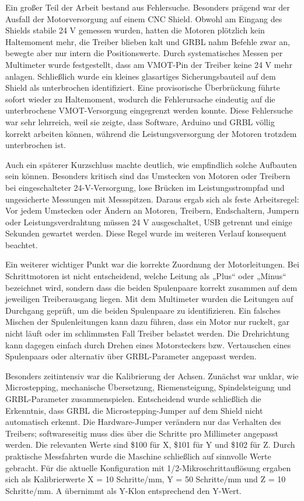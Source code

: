Ein großer Teil der Arbeit bestand aus Fehlersuche. Besonders prägend war der Ausfall der Motorversorgung auf einem CNC Shield. Obwohl am Eingang des Shields stabile 24 V gemessen wurden, hatten die Motoren plötzlich kein Haltemoment mehr, die Treiber blieben kalt und GRBL nahm Befehle zwar an, bewegte aber nur intern die Positionswerte. Durch systematisches Messen per Multimeter wurde festgestellt, dass am VMOT-Pin der Treiber keine 24 V mehr anlagen. Schließlich wurde ein kleines glasartiges Sicherungsbauteil auf dem Shield als unterbrochen identifiziert. Eine provisorische Überbrückung führte sofort wieder zu Haltemoment, wodurch die Fehlerursache eindeutig auf die unterbrochene VMOT-Versorgung eingegrenzt werden konnte. Diese Fehlersuche war sehr lehrreich, weil sie zeigte, dass Software, Arduino und GRBL völlig korrekt arbeiten können, während die Leistungsversorgung der Motoren trotzdem unterbrochen ist.

Auch ein späterer Kurzschluss machte deutlich, wie empfindlich solche Aufbauten sein können. Besonders kritisch sind das Umstecken von Motoren oder Treibern bei eingeschalteter 24-V-Versorgung, lose Brücken im Leistungsstrompfad und ungesicherte Messungen mit Messspitzen. Daraus ergab sich als feste Arbeitsregel: Vor jedem Umstecken oder Ändern an Motoren, Treibern, Endschaltern, Jumpern oder Leistungsverdrahtung müssen 24 V ausgeschaltet, USB getrennt und einige Sekunden gewartet werden. Diese Regel wurde im weiteren Verlauf konsequent beachtet.

Ein weiterer wichtiger Punkt war die korrekte Zuordnung der Motorleitungen. Bei Schrittmotoren ist nicht entscheidend, welche Leitung als „Plus“ oder „Minus“ bezeichnet wird, sondern dass die beiden Spulenpaare korrekt zusammen auf dem jeweiligen Treiberausgang liegen. Mit dem Multimeter wurden die Leitungen auf Durchgang geprüft, um die beiden Spulenpaare zu identifizieren. Ein falsches Mischen der Spulenleitungen kann dazu führen, dass ein Motor nur ruckelt, gar nicht läuft oder im schlimmsten Fall Treiber belastet werden. Die Drehrichtung kann dagegen einfach durch Drehen eines Motorsteckers bzw. Vertauschen eines Spulenpaars oder alternativ über GRBL-Parameter angepasst werden.

Besonders zeitintensiv war die Kalibrierung der Achsen. Zunächst war unklar, wie Microstepping, mechanische Übersetzung, Riemensteigung, Spindelsteigung und GRBL-Parameter zusammenspielen. Entscheidend wurde schließlich die Erkenntnis, dass GRBL die Microstepping-Jumper auf dem Shield nicht automatisch erkennt. Die Hardware-Jumper verändern nur das Verhalten des Treibers; softwareseitig muss dies über die Schritte pro Millimeter angepasst werden. Die relevanten Werte sind \$100 für X, \$101 für Y und \$102 für Z. Durch praktische Messfahrten wurde die Maschine schließlich auf sinnvolle Werte gebracht. Für die aktuelle Konfiguration mit 1/2-Mikroschrittauflösung ergaben sich als Kalibrierwerte X = 10 Schritte/mm, Y = 50 Schritte/mm und Z = 10 Schritte/mm. A übernimmt als Y-Klon entsprechend den Y-Wert.

